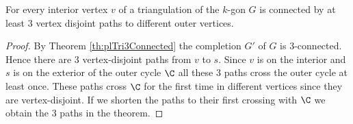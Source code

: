   \begin{thrm}
    \label{th:triOfK3:VertexDisjointPaths}
    For every interior vertex $v$ of a triangulation of the $k$-gon $G$ is connected by at least $3$ vertex disjoint paths to different outer vertices.
  \end{thrm}
  \begin{proof}
  By Theorem \ref{th:plTri3Connected} the completion $G'$ of $G$ is $3$-connected. Hence there are 3 vertex-disjoint paths from $v$ to $s$. Since $v$ is on the interior and $s$ is on the exterior of the outer cycle $\C$ all these 3 paths cross the outer cycle at least once. These paths cross $\C$ for the first time in different vertices since they are vertex-disjoint. If we shorten the paths to their first crossing with $\C$ we obtain the $3$ paths in the theorem.
  \end{proof}

